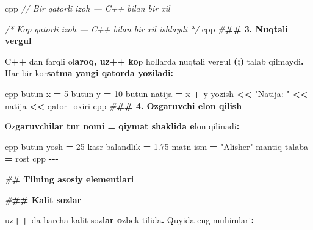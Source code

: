 \documentclass[a4paper,11pt,twoside,openright]{book}
\newenvironment{Shaded}{\begin{snugshade}}{\end{snugshade}}
\newcommand{\CharTok}[1]{\textcolor[rgb]{0.31,0.60,0.02}{#1}}
\newcommand{\CommentTok}[1]{\textcolor[rgb]{0.56,0.35,0.01}{\textit{#1}}}
\newcommand{\DecValTok}[1]{\textcolor[rgb]{0.00,0.00,0.81}{#1}}
\newcommand{\ErrorTok}[1]{\textcolor[rgb]{0.64,0.00,0.00}{\textbf{#1}}}
\newcommand{\FloatTok}[1]{\textcolor[rgb]{0.00,0.00,0.81}{#1}}
\newcommand{\NormalTok}[1]{#1}
\newcommand{\OperatorTok}[1]{\textcolor[rgb]{0.81,0.36,0.00}{\textbf{#1}}}
\newcommand{\PreprocessorTok}[1]{\textcolor[rgb]{0.56,0.35,0.01}{\textit{#1}}}
\newcommand{\StringTok}[1]{\textcolor[rgb]{0.31,0.60,0.02}{#1}}
\begin{document}
\begin{Shaded}
\begin{Highlighting}[]
\ErrorTok{\textasciigrave{}\textasciigrave{}\textasciigrave{}}\NormalTok{cpp}
\CommentTok{// Bir qatorli izoh — C++ bilan bir xil}

\CommentTok{/*}
\CommentTok{   Ko\textquotesingle{}p qatorli izoh —}
\CommentTok{   C++ bilan bir xil ishlaydi}
\CommentTok{*/}
\ErrorTok{\textasciigrave{}\textasciigrave{}\textasciigrave{}}\NormalTok{cpp}
\PreprocessorTok{\#}\ErrorTok{\#\# 3. Nuqtali vergul}

\NormalTok{C}\OperatorTok{++}\NormalTok{ dan farqli o}\CharTok{\textquotesingle{}l}\ErrorTok{aroq, uz++ ko}\CharTok{\textquotesingle{}}\NormalTok{p hollarda nuqtali vergul }\OperatorTok{(}\ErrorTok{\textasciigrave{}}\OperatorTok{;}\ErrorTok{\textasciigrave{}}\OperatorTok{)}\NormalTok{ talab qilmaydi}\OperatorTok{.}\NormalTok{ Har bir ko}\CharTok{\textquotesingle{}r}\ErrorTok{satma yangi qatorda yoziladi:}

\ErrorTok{\textasciigrave{}\textasciigrave{}\textasciigrave{}}\NormalTok{cpp}
\NormalTok{butun x }\OperatorTok{=} \DecValTok{5}
\NormalTok{butun y }\OperatorTok{=} \DecValTok{10}
\NormalTok{butun natija }\OperatorTok{=}\NormalTok{ x }\OperatorTok{+}\NormalTok{ y}
\NormalTok{yozish }\OperatorTok{\textless{}\textless{}} \StringTok{"Natija: "} \OperatorTok{\textless{}\textless{}}\NormalTok{ natija }\OperatorTok{\textless{}\textless{}}\NormalTok{ qator\_oxiri}
\ErrorTok{\textasciigrave{}\textasciigrave{}\textasciigrave{}}\NormalTok{cpp}
\PreprocessorTok{\#}\ErrorTok{\#\# 4. O\textquotesingle{}zgaruvchi e\textquotesingle{}lon qilish}

\NormalTok{O}\CharTok{\textquotesingle{}z}\ErrorTok{garuvchilar \textasciigrave{}tur nomi = qiymat\textasciigrave{} shaklida e}\CharTok{\textquotesingle{}}\NormalTok{lon qilinadi}\OperatorTok{:}

\ErrorTok{\textasciigrave{}\textasciigrave{}\textasciigrave{}}\NormalTok{cpp}
\NormalTok{butun yosh }\OperatorTok{=} \DecValTok{25}
\NormalTok{kasr balandlik }\OperatorTok{=} \FloatTok{1.75}
\NormalTok{matn ism }\OperatorTok{=} \StringTok{"Alisher"}
\NormalTok{mantiq talaba }\OperatorTok{=}\NormalTok{ rost}
\ErrorTok{\textasciigrave{}\textasciigrave{}\textasciigrave{}}\NormalTok{cpp}
\OperatorTok{{-}{-}{-}}

\PreprocessorTok{\#}\ErrorTok{\# Tilning asosiy elementlari}

\PreprocessorTok{\#}\ErrorTok{\#\# Kalit so\textquotesingle{}zlar}

\NormalTok{uz}\OperatorTok{++}\NormalTok{ da barcha kalit so}\CharTok{\textquotesingle{}z}\ErrorTok{lar o}\CharTok{\textquotesingle{}}\NormalTok{zbek tilida}\OperatorTok{.}\NormalTok{ Quyida eng muhimlari}\OperatorTok{:}


\end{Highlighting}
\end{Shaded}
\end{document}
